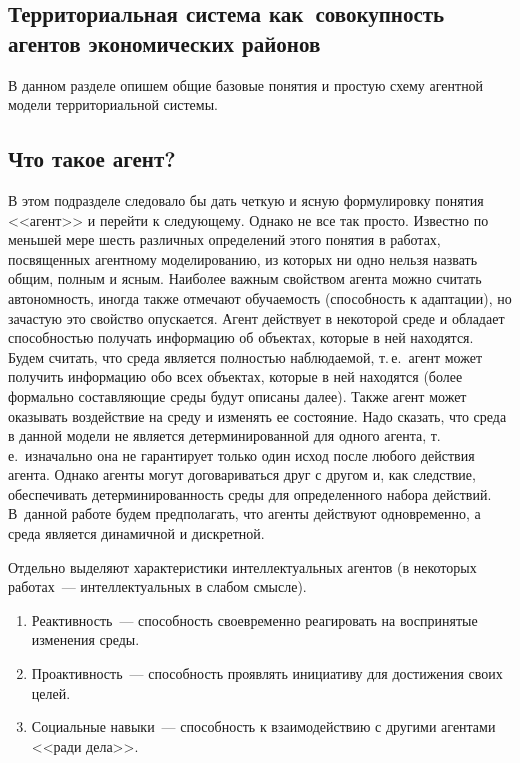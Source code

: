 \begin{multicols}{2}
\section{Территориальная система как~совокупность агентов 
экономических районов}
  
  В данном разделе опишем общие базовые понятия и простую схему агентной 
модели территориальной системы.

\subsection{ Что такое агент?}

  В этом подразделе следовало бы дать четкую и ясную формулировку понятия 
<<агент>> и перейти к следующему. Однако не все так просто. Известно по 
меньшей мере шесть различных определений этого понятия в работах, 
посвященных агентному моделированию, из которых ни одно \mbox{нельзя} назвать 
общим, полным и ясным. Наиболее важным свойством агента можно считать 
автономность, иногда также отмечают обучаемость (способность к адаптации),  
но зачастую это свойство опускается. Агент действует в некоторой среде и 
обладает спо\-соб\-ностью получать информацию об объектах, которые в ней 
находятся. Будем считать, что среда является полностью наблюдаемой, т.\,е.\ 
агент может получить информацию обо всех объектах, которые в ней находятся 
(более формально составляющие среды будут описаны далее). Также агент 
может оказывать воздействие на среду и изменять ее состояние. Надо сказать, 
что среда в данной модели не является детерминированной для одного агента, 
т.\,е.\ изначально она не гарантирует только один исход после любого действия 
агента. Однако агенты могут договариваться друг с другом и, как следствие, 
обеспечивать детерминированность среды для определенного набора действий. 
В~данной работе будем предполагать, что агенты действуют одновременно, а 
среда является динамичной и дискретной. 
  
  Отдельно выделяют характеристики интеллектуальных агентов (в некоторых 
работах~--- интеллектуальных в слабом смысле).
  \begin{enumerate}
\item Реактивность~--- способность своевременно реагировать на воспринятые 
изменения среды.
\item Проактивность~--- способность проявлять инициативу для достижения 
своих целей.
\item Социальные навыки~--- способность к взаимодействию с другими 
агентами <<ради дела>>. 
\end{enumerate}


\end{multicols}
